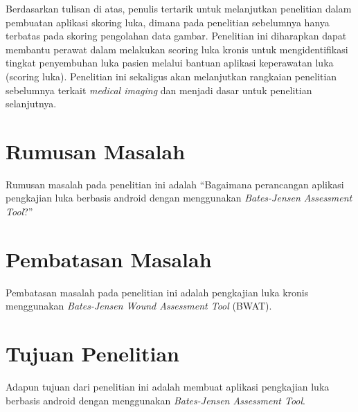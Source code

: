 Berdasarkan tulisan di atas, penulis tertarik untuk melanjutkan penelitian \citep{rahmadati2023aplikasi} dalam pembuatan aplikasi skoring luka, dimana pada penelitian sebelumnya hanya terbatas pada skoring pengolahan data gambar. Penelitian ini diharapkan dapat membantu perawat dalam melakukan scoring luka kronis untuk mengidentifikasi tingkat penyembuhan luka pasien melalui bantuan aplikasi keperawatan luka (scoring luka). Penelitian ini sekaligus akan melanjutkan rangkaian penelitian sebelumnya terkait \textit{medical imaging} dan menjadi dasar untuk penelitian selanjutnya.

\section{Rumusan Masalah}
Rumusan masalah pada penelitian ini adalah “Bagaimana perancangan aplikasi pengkajian luka berbasis android dengan menggunakan \textit{Bates-Jensen Assessment Tool}?”

\section{Pembatasan Masalah}
Pembatasan masalah pada penelitian ini adalah pengkajian luka kronis menggunakan \textit{Bates-Jensen Wound Assessment Tool} (BWAT).

\section{Tujuan Penelitian}
Adapun tujuan dari penelitian ini adalah membuat aplikasi pengkajian luka berbasis android  dengan menggunakan \textit{Bates-Jensen Assessment Tool}.


